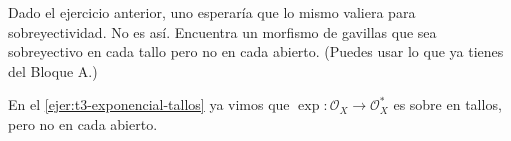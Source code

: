 \begin{ejer}[¿Y sobreyectivo?]\label{ejer:t3-sobreyectividad-tallos}
Dado el ejercicio anterior, uno esperaría que lo mismo valiera para sobreyectividad. No es así. Encuentra un morfismo de gavillas que sea sobreyectivo en cada tallo pero no en cada abierto. (Puedes usar lo que ya tienes del Bloque A.)
\end{ejer}
\begin{sol}
En el \cref{ejer:t3-exponencial-tallos} ya vimos que $\exp\colon\mathcal O_X\to\mathcal O_X^*$ es sobre en tallos, pero no en cada abierto.
\end{sol}
